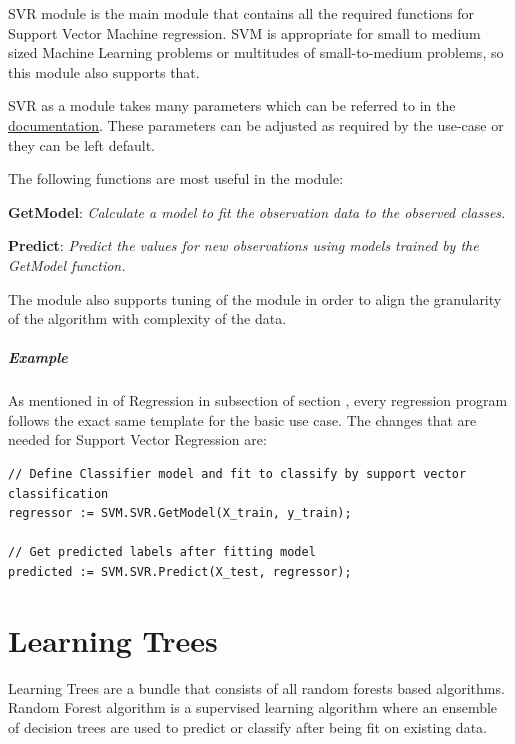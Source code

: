 SVR module is the main module that contains all the required functions for Support Vector Machine regression. SVM is appropriate for small to medium sized Machine Learning problems or multitudes of small-to-medium problems, so this module also supports that. 

SVR as a module takes many parameters which can be referred to in the \href{https://cdn.hpccsystems.com/pdf/ml/SupportVectorMachines.pdf}{documentation}. These parameters can be adjusted as required by the use-case or they can be left default. 

The following functions are most useful in the module:

\textbf{GetModel}: \textit{Calculate a model to fit the observation data to the observed classes.}

\textbf{Predict}: \textit{Predict the values for new observations using models trained by the GetModel function.}

The module also supports tuning of the module in order to align the granularity of the algorithm with complexity of the data.

\paragraph{Example}

As mentioned in  of Regression in  subsection of section , every regression program follows the exact same template for the basic use case. The changes that are needed for Support Vector Regression are:

\begin{lstlisting}
// Define Classifier model and fit to classify by support vector classification
regressor := SVM.SVR.GetModel(X_train, y_train);

// Get predicted labels after fitting model
predicted := SVM.SVR.Predict(X_test, regressor);
\end{lstlisting}

\chapter{Learning Trees}\label{supe:learntrees}

Learning Trees are a bundle that consists of all random forests based algorithms. Random Forest algorithm is a supervised learning algorithm where an ensemble of decision trees are used to predict or classify after being fit on existing data.

